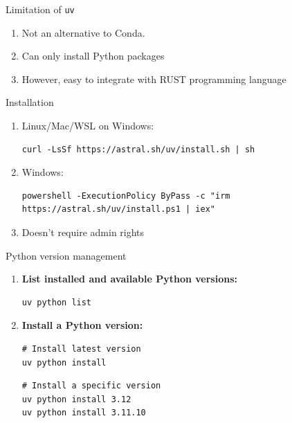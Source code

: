 \documentclass[aspectratio=169,xcolor=dvipsnames,svgnames,x11names,fleqn]{beamer}
\begin{document}
\begin{frame}{Limitation of \texttt{uv}}

    \begin{enumerate}
        \item Not an alternative to Conda.
        \item Can only install Python packages
        \item However, easy to integrate with RUST programming language
    \end{enumerate}
    
\end{frame}


\begin{frame}[containsverbatim]{Installation}

    \begin{enumerate}
        \item Linux/Mac/WSL on Windows:
        \begin{verbatim}
curl -LsSf https://astral.sh/uv/install.sh | sh
\end{verbatim}

\item Windows:
\begin{verbatim}
powershell -ExecutionPolicy ByPass -c "irm https://astral.sh/uv/install.ps1 | iex"
\end{verbatim}
\item Doesn't require admin rights
    \end{enumerate}
\end{frame}

\begin{frame}[containsverbatim]{Python version management}

    \begin{enumerate}
        \item \textbf{List installed and available Python versions:}
        \begin{verbatim}
uv python list
        \end{verbatim}
        \item \textbf{Install a Python version:}
        \begin{verbatim}
# Install latest version
uv python install
        \end{verbatim}
        \begin{verbatim}
# Install a specific version
uv python install 3.12
uv python install 3.11.10
        \end{verbatim}
    \end{enumerate}

\end{frame}
\end{document}
